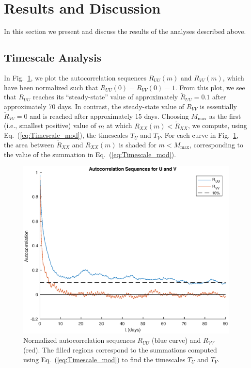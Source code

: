 \documentclass[11pt, oneside]{article}
\newcommand{\figref}[1]{Fig.~\ref{#1}}
\newcommand{\eqnref}[1]{Eq.~(\ref{#1})}
\begin{document}
\section{Results and Discussion}\label{sec:Results}
In this section we present and discuss the results of the analyses described above.

\subsection{Timescale Analysis}\label{sec:Results:Timescale}
In \figref{fig:Autocorrelations}, we plot the autocorrelation sequences $R_{UU}(m)$ and $R_{VV}(m)$, which have been normalized such that $R_{UU}(0) = R_{VV}(0) = 1$.
From this plot, we see that $R_{UU}$ reaches its ``steady-state'' value of approximately $\tilde{R}_{UU} = 0.1$ after approximately 70 days.
In contrast, the steady-state value of $R_{VV}$ is essentially $\tilde{R}_{VV} = 0$ and is reached after approximately 15 days.
Choosing $M_\text{max}$ as the first (i.e., smallest positive) value of $m$ at which $R_{XX}(m) < \tilde{R}_{XX}$, we compute, using \eqnref{eq:Timescale_mod}, the timescales $T_U$ and $T_V$.
For each curve in \figref{fig:Autocorrelations}, the area between $\tilde{R}_{XX}$ and $R_{XX}(m)$ is shaded for $m < M_\text{max}$, corresponding to the value of the summation in \eqnref{eq:Timescale_mod}.

\begin{figure}[htb]
\centering
\includegraphics[width=0.7\columnwidth]{figures/AutocorrelationSequences_90days}
\caption{Normalized autocorrelation sequences $R_{UU}$ (blue curve) and $R_{VV}$ (red).
The filled regions correspond to the summations computed using \eqnref{eq:Timescale_mod} to find the timescales $T_U$ and $T_V$.}
\label{fig:Autocorrelations}
\end{figure}
\end{document}

